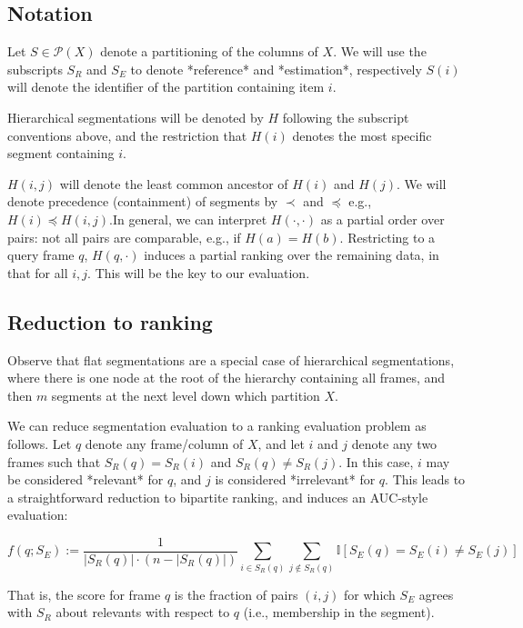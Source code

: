 \documentclass{article}
\begin{document}
\subsection{Notation}

Let $S \in \mathcal{P}(X)$ denote a partitioning of the columns of $X$.
We will use the subscripts $S_R$ and $S_E$ to denote *reference* and *estimation*, respectively
$S(i)$ will denote the identifier of the partition containing item $i$.

Hierarchical segmentations will be denoted by $H$ following the subscript conventions above, and the restriction that $H(i)$ denotes the most specific segment containing $i$.

$H(i, j)$ will denote the least common ancestor of $H(i)$ and $H(j)$.
We will denote precedence (containment) of segments by $\prec$ and $\preceq$ e.g., $H(i) \preceq H(i, j)$.In general, we can interpret $H(\cdot, \cdot)$ as a partial order over pairs: not all pairs are comparable, e.g., if $H(a) = H(b)$.
Restricting to a query frame $q$, $H(q, \cdot)$ induces a partial ranking over the remaining data, in that for all $i, j$.
This will be the key to our evaluation.


\subsection{Reduction to ranking}

Observe that flat segmentations are a special case of hierarchical segmentations, where there is one node at the root of the hierarchy containing all frames, and then $m$ segments at the next level down which partition $X$.

We can reduce segmentation evaluation to a ranking evaluation problem as follows.
Let $q$ denote any frame/column of $X$, and let $i$ and $j$ denote any two frames such that $S_R(q) = S_R(i)$ and $S_R(q) \neq S_R(j)$.
In this case, $i$ may be considered *relevant* for $q$, and $j$ is considered *irrelevant* for $q$.
This leads to a straightforward reduction to bipartite ranking, and induces an AUC-style evaluation:

$$
f(q ; S_E) := \frac{1}{|S_R(q)|\cdot (n - |S_R(q)|)} \sum_{i \in S_R(q)} \sum_{j \notin S_R(q)}  \mathbb{I}\left[ S_E(q) = S_E(i) \neq S_E(j) \right]
$$

That is, the score for frame $q$ is the fraction of pairs $(i, j)$ for which $S_E$ agrees with $S_R$ about relevants with respect to $q$ (i.e., membership in the segment).
\end{document}

